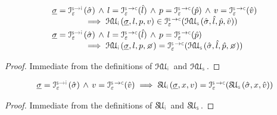 \begin{lemma}
$$
\begin{array}{l}
\istate = \interpret{\symbinst}{\senv}(\sstate) \, \wedge \, 
   \loc = \interpret{\symbconc}{\senv}(\sloc)  \, \wedge \, 
   p = \interpret{\symbconc}{\senv}(\sexprp)  \, \wedge \, 
   \val = \interpret{\symbconc}{\senv}(\sexprv)   \\  \qquad \qquad
       \implies \hpupdt{\instrumented}(\istate, \loc, p, \val) \in \interpret{\symbconc}{\senv}(\hpupdt{\symbolic}(\sstate, \sloc, \sexprp, \sexprv)) \\[3pt]
%       
\istate = \interpret{\symbinst}{\senv}(\sstate) \, \wedge \, 
   \loc = \interpret{\symbconc}{\senv}(\sloc)  \, \wedge \, 
   p = \interpret{\symbconc}{\senv}(\sexprp) \\  \qquad \qquad
  \implies \hpupdt{\instrumented}(\istate, \loc, p, \none) = \interpret{\symbconc}{\senv}(\hpupdt{\symbolic}(\sstate, \sloc, \sexprp, \none)) 
\end{array}
$$
\end{lemma}
\begin{proof}
Immediate from the definitions of $\hpupdt{\instrumented}$ and $\hpupdt{\symbolic}$.
\end{proof}


\begin{lemma}
$$
\begin{array}{l}
\istate = \interpret{\symbinst}{\senv}(\sstate) \, \wedge \, 
   \val = \interpret{\symbconc}{\senv}(\sexprv)   
       \implies \stupdt{\instrumented}(\istate, \jvar, \val) = \interpret{\symbconc}{\senv}(\stupdt{\symbolic}(\sstate, \jvar, \sexprv))
\end{array}
$$
\end{lemma}
\begin{proof}
Immediate from the definitions of $\stupdt{\instrumented}$ and $\stupdt{\symbolic}$.
\end{proof}


